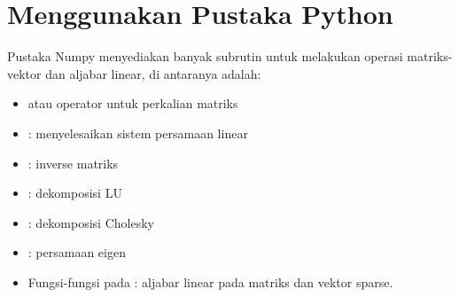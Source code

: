 \section{Menggunakan Pustaka Python}

Pustaka Numpy menyediakan banyak subrutin untuk melakukan operasi matriks-vektor dan
aljabar linear, di antaranya adalah:
\begin{itemize}
\item {} atau operator  untuk perkalian matriks
\item {}: menyelesaikan sistem persamaan linear
\item {}: inverse matriks
\item {}: dekomposisi LU
\item {}: dekomposisi Cholesky
\item {}: persamaan eigen
\item Fungsi-fungsi pada : aljabar linear pada matriks dan
vektor sparse.
\end{itemize}

